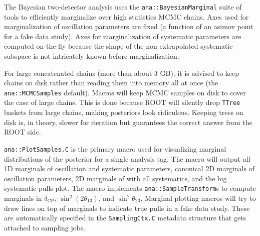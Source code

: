 \documentclass{article}
\begin{document}
The Bayesian two-detector analysis uses the \texttt{ana::\-Bayesian\-Marginal} suite of tools to efficiently marginalize over high statistics MCMC chains. Axes used for marginalization of oscillation parameters are fixed (a function of an asimov point for a fake data study). Axes for marginalization of systematic parameters are computed on-the-fly because the shape of the non-extrapolated systematic subspace is not intricately known before marginalization.

For large concatenated chains (more than about 3 GB), it is advised to keep chains on disk rather than reading them into memory all at once (the \texttt{ana::\-MCMC\-Samples} default). Macros will keep MCMC samples on disk to cover the case of large chains. This is done because ROOT will silently drop \texttt{TTree} baskets from large chains, making posteriors look ridiculous. Keeping trees on disk is, in theory, slower for iteration but guarantees the correct answer from the ROOT side.

\texttt{ana::\-Plot\-Samples\-.C} is the primary macro used for visualizing marginal distributions of the posterior for a single analysis tag. The macro will output all 1D marginals of oscillation and systematic parameters, canonical 2D marginals of oscillation parameters, 2D marginals of  with all systematics, and the big systematic pulls plot.
The macro implements \texttt{ana::\-Sample\-Transform}s to compute marginals in $\delta_{\mathrm{CP}}$, $\sin^2(2\theta_{13})$, and $\sin^2\theta_{23}$. Marginal plotting macros will try to draw lines on top of marginals to indicate true pulls in a fake data study. These are automatically specified in the \texttt{Sampling\-Ctx\-.C} metadata structure that gets attached to sampling jobs.
\end{document}

